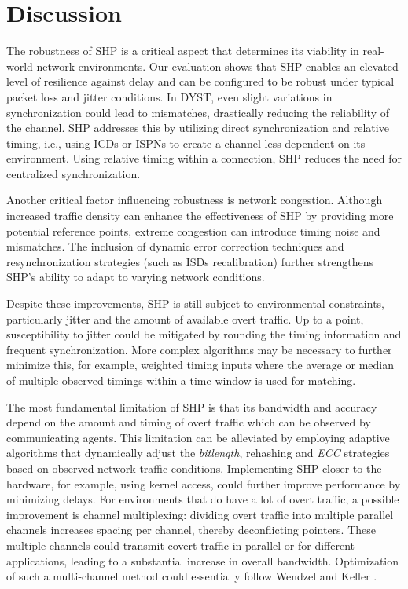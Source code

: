 \documentclass[journal]{IEEEtran}
\begin{document}
\section{Discussion}
\label{sec:discussion}
The robustness of \ac{SHP} is a critical aspect that determines its viability in real-world network environments. Our evaluation shows that \ac{SHP} enables an elevated level of resilience against delay and can be configured to be robust under typical packet loss and jitter conditions. In \ac{DYST}, even slight variations in synchronization could lead to mismatches, drastically reducing the reliability of the channel. SHP addresses this by utilizing direct synchronization and relative timing, i.e., using \ac{ICD}s or \ac{ISPN}s to create a channel less dependent on its environment. Using relative timing within a connection, \ac{SHP} reduces the need for centralized synchronization.

Another critical factor influencing robustness is network congestion. Although increased traffic density can enhance the effectiveness of \ac{SHP} by providing more potential reference points, extreme congestion can introduce timing noise and mismatches. The inclusion of dynamic error correction techniques and resynchronization strategies (such as \ac{ISD}s recalibration) further strengthens \ac{SHP}’s ability to adapt to varying network conditions.

Despite these improvements, \ac{SHP} is still subject to environmental constraints, particularly jitter and the amount of available overt traffic. Up to a point, susceptibility to jitter could be mitigated by rounding the timing information and frequent synchronization. More complex algorithms may be necessary to further minimize this, for example, weighted timing inputs where the average or median of multiple observed timings within a time window is used for matching. 

The most fundamental limitation of \ac{SHP} is that its bandwidth and accuracy depend on the amount and timing of overt traffic which can be observed by communicating agents. This limitation can be alleviated by employing adaptive algorithms that dynamically adjust the \textit{bitlength}, {rehashing} and \textit{ECC} strategies based on observed network traffic conditions.  Implementing \ac{SHP} closer to the hardware, for example, using kernel access, could further improve performance by minimizing delays. For environments that do have a lot of overt traffic, a possible improvement is channel multiplexing: dividing overt traffic into multiple parallel channels increases spacing per channel, thereby deconflicting pointers. These multiple channels could transmit covert traffic in parallel or for different applications, leading to a substantial increase in overall bandwidth. Optimization of such a multi-channel method could essentially follow Wendzel and Keller \cite{wendzelLowAttention}.
\end{document}
